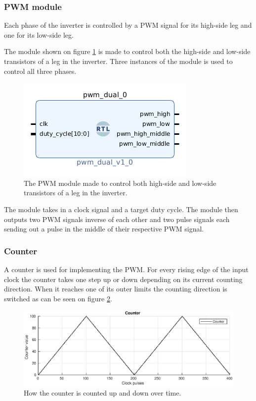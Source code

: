 \subsubsection{PWM module}
\label{sec:pwm}
Each phase of the inverter is controlled by a PWM signal for its high-side leg and one for its low-side leg. 

The module shown on figure \ref{fig:pwm_module} is made to control both the high-side and low-side transistors of a leg in the inverter. Three instances of the module is used to control all three phases.
\begin{figure}[H]
	\centering
	\includegraphics[width=0.5 \textwidth]{pictures/software/pwm_module.png}
	\caption{The PWM module made to control both high-side and low-side transistors of a leg in the inverter.}
	\label{fig:pwm_module}
\end{figure}
The module takes in a clock signal and a target duty cycle. The module then outputs two PWM signals inverse of each other and two pulse signals each sending out a pulse in the middle of their respective PWM signal.


\subsubsection*{Counter}
A counter is used for implementing the PWM. For every rising edge of the input clock the counter takes one step up or down depending on its current counting direction. When it reaches one of its outer limits the counting direction is switched as can be seen on figure \ref{fig:counter}.

\begin{figure}[H]
	\centering
	\includegraphics[width=1 \textwidth]{pictures/software/counter.eps}
	\caption{How the counter is counted up and down over time.}
	\label{fig:counter}
\end{figure}

